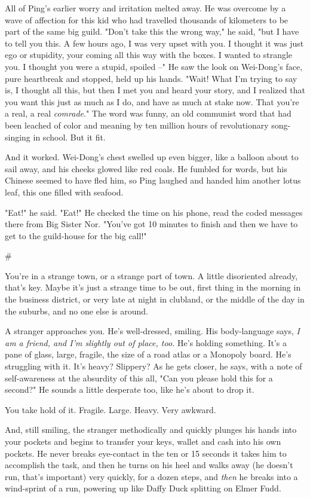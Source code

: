 All of Ping's earlier worry and irritation melted away. He was
overcome by a wave of affection for this kid who had travelled
thousands of kilometers to be part of the same big guild. "Don't
take this the wrong way," he said, "but I have to tell you this. A
few hours ago, I was very upset with you. I thought it was just ego
or stupidity, your coming all this way with the boxes. I wanted to
strangle you. I thought you were a stupid, spoiled --" He saw the
look on Wei-Dong's face, pure heartbreak and stopped, held up his
hands. "Wait! What I'm trying to say is, I thought all this, but
then I met you and heard your story, and I realized that you want
this just as much as I do, and have as much at stake now. That
you're a real, a real \emph{comrade}." The word was funny, an old
communist word that had been leached of color and meaning by ten
million hours of revolutionary song-singing in school. But it fit.

And it worked. Wei-Dong's chest swelled up even bigger, like a
balloon about to sail away, and his cheeks glowed like red coals.
He fumbled for words, but his Chinese seemed to have fled him, so
Ping laughed and handed him another lotus leaf, this one filled
with seafood.

"Eat!" he said. "Eat!" He checked the time on his phone, read the
coded messages there from Big Sister Nor. "You've got 10 minutes to
finish and then we have to get to the guild-house for the big
call!"

\#

You're in a strange town, or a strange part of town. A little
disoriented already, that's key. Maybe it's just a strange time to
be out, first thing in the morning in the business district, or
very late at night in clubland, or the middle of the day in the
suburbs, and no one else is around.

A stranger approaches you. He's well-dressed, smiling. His
body-language says,
\emph{I am a friend, and I'm slightly out of place, too.} He's
holding something. It's a pane of glass, large, fragile, the size
of a road atlas or a Monopoly board. He's struggling with it. It's
heavy? Slippery? As he gets closer, he says, with a note of
self-awareness at the absurdity of this all, "Can you please hold
this for a second?" He sounds a little desperate too, like he's
about to drop it.

You take hold of it. Fragile. Large. Heavy. Very awkward.

And, still smiling, the stranger methodically and quickly plunges
his hands into your pockets and begins to transfer your keys,
wallet and cash into his own pockets. He never breaks eye-contact
in the ten or 15 seconds it takes him to accomplish the task, and
then he turns on his heel and walks away (he doesn't run, that's
important) very quickly, for a dozen steps, and \emph{then} he
breaks into a wind-sprint of a run, powering up like Daffy Duck
splitting on Elmer Fudd.

